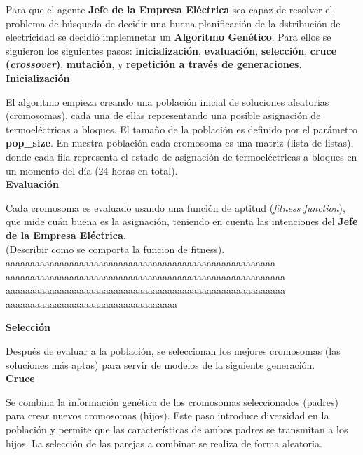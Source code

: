 \documentclass[twocolumn, fontsize=10pt]{article}
\begin{document}
Para que el agente \textbf{Jefe de la Empresa Eléctrica} sea capaz de resolver el problema de búsqueda de decidir una buena planificación
de la dstribución de electricidad se decidió implemnetar un \textbf{Algoritmo Genético}. Para ellos se siguieron los siguientes pasos:
\textbf{inicialización}, \textbf{evaluación}, \textbf{selección}, 
\textbf{cruce (\textit{crossover})}, \textbf{mutación}, y \textbf{repetición a través de 
generaciones}.\\

\textbf{Inicialización}

El algoritmo empieza creando una población 
inicial de soluciones aleatorias (cromosomas), cada una de 
ellas representando una posible asignación de termoeléctricas a bloques. 
El tamaño de la población es definido por el parámetro \textbf{pop\_size}. 
En nuestra población cada cromosoma es una matriz (lista de listas), donde cada fila 
representa el estado de asignación de termoeléctricas a bloques 
en un momento del día (24 horas en total). \\

\textbf{Evaluación}

Cada cromosoma es evaluado usando una función de aptitud (\textit{fitness function}), 
que mide cuán buena es la asignación, teniendo en 
cuenta las intenciones del \textbf{Jefe de la Empresa Eléctrica}. \\
(Describir como se comporta la funcion de fitness). \\
aaaaaaaaaaaaaaaaaaaaaaaaaaaaaaaaaaaaaaaaaaaaaaaaaaaaaaa\\
aaaaaaaaaaaaaaaaaaaaaaaaaaaaaaaaaaaaaaaaaaaaaaaaaaaaaaaaa\\
aaaaaaaaaaaaaaaaaaaaaaaaaaaaaaaaaaaaaaaaaaaaaaaaaaaaaaaaa\\
aaaaaaaaaaaaaaaaaaaaaaaaaaaaaaaaaaa

\textbf{Selección}

Después de evaluar a la población, se seleccionan los mejores 
cromosomas (las soluciones más aptas) para servir de modelos de 
la siguiente generación. \\

\textbf{Cruce}

Se combina la información genética de 
los cromosomas seleccionados (padres) para crear nuevos 
cromosomas (hijos). Este paso introduce diversidad en la 
población y permite que las características de ambos padres se 
transmitan a los hijos. La selección de las parejas a combinar 
se realiza de forma aleatoria. \\
\end{document}
